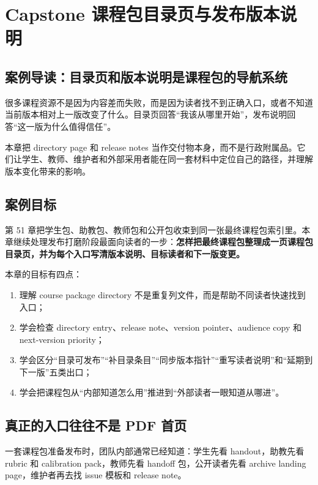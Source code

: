\chapter{Capstone 课程包目录页与发布版本说明}

\section{案例导读：目录页和版本说明是课程包的导航系统}

很多课程资源不是因为内容差而失败，而是因为读者找不到正确入口，或者不知道当前版本相对上一版改变了什么。目录页回答“我该从哪里开始”，发布说明回答“这一版为什么值得信任”。

本章把 directory page 和 release notes 当作交付物本身，而不是行政附属品。它们让学生、教师、维护者和外部采用者能在同一套材料中定位自己的路径，并理解版本变化带来的影响。

\section{案例目标}

第 51 章把学生包、助教包、教师包和公开包收束到同一张最终课程包索引里。本章继续处理发布打磨阶段最面向读者的一步：\textbf{怎样把最终课程包整理成一页课程包目录页，并为每个入口写清版本说明、目标读者和下一版变更。}

本章的目标有四点：

\begin{enumerate}
    \item 理解 course package directory 不是重复列文件，而是帮助不同读者快速找到入口；
    \item 学会检查 directory entry、release note、version pointer、audience copy 和 next-version priority；
    \item 学会区分“目录可发布”“补目录条目”“同步版本指针”“重写读者说明”和“延期到下一版”五类出口；
    \item 学会把课程包从“内部知道怎么用”推进到“外部读者一眼知道从哪进”。
\end{enumerate}

\section{真正的入口往往不是 PDF 首页}

一套课程包准备发布时，团队内部通常已经知道：学生先看 handout，助教先看 rubric 和 calibration pack，教师先看 handoff 包，公开读者先看 archive landing page，维护者再去找 issue 模板和 release note。

